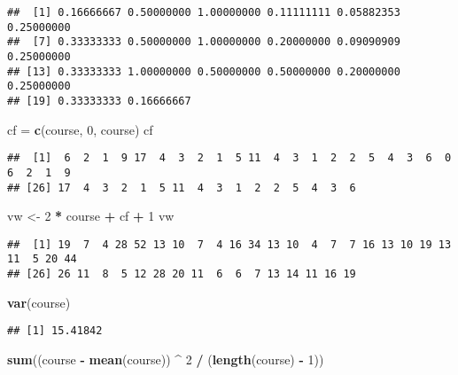\documentclass[
]{article}
\newenvironment{Shaded}{\begin{snugshade}}{\end{snugshade}}
\newcommand{\DecValTok}[1]{\textcolor[rgb]{0.00,0.00,0.81}{#1}}
\newcommand{\FunctionTok}[1]{\textcolor[rgb]{0.13,0.29,0.53}{\textbf{#1}}}
\newcommand{\NormalTok}[1]{#1}
\newcommand{\OtherTok}[1]{\textcolor[rgb]{0.56,0.35,0.01}{#1}}
\newcommand{\SpecialCharTok}[1]{\textcolor[rgb]{0.81,0.36,0.00}{\textbf{#1}}}
\begin{document}
\begin{verbatim}
##  [1] 0.16666667 0.50000000 1.00000000 0.11111111 0.05882353 0.25000000
##  [7] 0.33333333 0.50000000 1.00000000 0.20000000 0.09090909 0.25000000
## [13] 0.33333333 1.00000000 0.50000000 0.50000000 0.20000000 0.25000000
## [19] 0.33333333 0.16666667
\end{verbatim}

\begin{Shaded}
\begin{Highlighting}[]
\NormalTok{cf }\OtherTok{=} \FunctionTok{c}\NormalTok{(course, }\DecValTok{0}\NormalTok{, course)}
\NormalTok{cf}
\end{Highlighting}
\end{Shaded}

\begin{verbatim}
##  [1]  6  2  1  9 17  4  3  2  1  5 11  4  3  1  2  2  5  4  3  6  0  6  2  1  9
## [26] 17  4  3  2  1  5 11  4  3  1  2  2  5  4  3  6
\end{verbatim}

\begin{Shaded}
\begin{Highlighting}[]
\NormalTok{vw }\OtherTok{\textless{}{-}} \DecValTok{2} \SpecialCharTok{*}\NormalTok{ course }\SpecialCharTok{+}\NormalTok{ cf }\SpecialCharTok{+} \DecValTok{1}
\NormalTok{vw}
\end{Highlighting}
\end{Shaded}

\begin{verbatim}
##  [1] 19  7  4 28 52 13 10  7  4 16 34 13 10  4  7  7 16 13 10 19 13 11  5 20 44
## [26] 26 11  8  5 12 28 20 11  6  6  7 13 14 11 16 19
\end{verbatim}

\begin{Shaded}
\begin{Highlighting}[]
\FunctionTok{var}\NormalTok{(course)}
\end{Highlighting}
\end{Shaded}

\begin{verbatim}
## [1] 15.41842
\end{verbatim}

\begin{Shaded}
\begin{Highlighting}[]
\FunctionTok{sum}\NormalTok{((course }\SpecialCharTok{{-}} \FunctionTok{mean}\NormalTok{(course)) }\SpecialCharTok{\^{}} \DecValTok{2} \SpecialCharTok{/}\NormalTok{ (}\FunctionTok{length}\NormalTok{(course) }\SpecialCharTok{{-}} \DecValTok{1}\NormalTok{))}
\end{Highlighting}
\end{Shaded}
\end{document}

